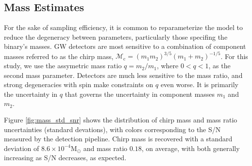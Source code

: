 \subsection{Mass Estimates}

For the sake of sampling efficiency, it is common to reparameterize the model to reduce the degeneracy between parameters, particularly those specifing the binary's masses.  GW detectors are most sensitive to a combination of component masses referred to as the chirp mass, $\mathcal{M}_\mathrm{c} = (m_1 m_2)^{3/5} (m_1 + m_2)^{-1/5}$.  For this study, we use the assymetric mass ratio $q = m_2/m_1$, where $0 < q < 1$, as the second mass parameter.  Detectors are much less sensitive to the mass ratio, and strong degeneracies with spin make constraints on $q$ even worse.  It is primarily the uncertainty in $q$ that governs the uncertainty in component masses $m_1$ and $m_2$.

Figure \ref{fig:mass_std_snr} shows the distribution of chirp mass and mass ratio uncertainties (standard devations), with colors corresponding to the S/N measured by the detection pipeline.  Chirp mass is recovered with a standard deviation of $8.6 \times 10^{-4} \mathrm{M}_\odot$ and mass ratio $0.18$, on average, with both generally increasing as S/N decreases, as expected.